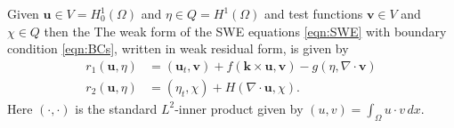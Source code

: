 Given $\mathbf{u} \in V=H^1_0(\Omega)$ and $\eta \in Q=H^1(\Omega)$ and
test functions $\mathbf{v} \in V$ and $\chi \in Q$ then the The weak form of the
SWE equations \eqref{eqn:SWE} with boundary condition \eqref{eqn:BCs}, written
in weak residual form, is given by
\begin{equation}
  \begin{split}
    r_1(\mathbf{u},\eta) &= (\mathbf{u}_t, \mathbf{v}) + f(\mathbf{k} \times
        \mathbf{u}, \mathbf{v}) - g (\eta, \nabla\cdot \mathbf{v})\\
    r_2(\mathbf{u},\eta) &= (\eta_t, \chi) + H (\nabla\cdot \mathbf{u},\chi).
  \end{split}
  \label{eqn:WeakSWE}
\end{equation}
Here $(\cdot, \cdot)$ is the standard $L^2$-inner product given by $(u,v) =
\int_{\Omega}\! u\cdot v\, dx$.
